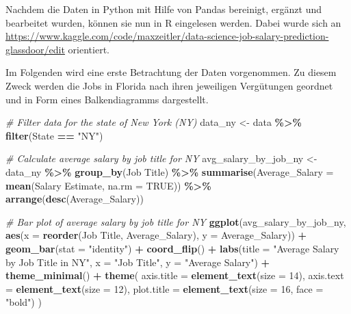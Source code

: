 \documentclass[
]{article}
\newenvironment{Shaded}{\begin{snugshade}}{\end{snugshade}}
\newcommand{\AttributeTok}[1]{\textcolor[rgb]{0.13,0.29,0.53}{#1}}
\newcommand{\CommentTok}[1]{\textcolor[rgb]{0.56,0.35,0.01}{\textit{#1}}}
\newcommand{\ConstantTok}[1]{\textcolor[rgb]{0.56,0.35,0.01}{#1}}
\newcommand{\DecValTok}[1]{\textcolor[rgb]{0.00,0.00,0.81}{#1}}
\newcommand{\FunctionTok}[1]{\textcolor[rgb]{0.13,0.29,0.53}{\textbf{#1}}}
\newcommand{\NormalTok}[1]{#1}
\newcommand{\OtherTok}[1]{\textcolor[rgb]{0.56,0.35,0.01}{#1}}
\newcommand{\SpecialCharTok}[1]{\textcolor[rgb]{0.81,0.36,0.00}{\textbf{#1}}}
\newcommand{\StringTok}[1]{\textcolor[rgb]{0.31,0.60,0.02}{#1}}
\begin{document}
Nachdem die Daten in Python mit Hilfe von Pandas bereinigt, ergänzt und
bearbeitet wurden, können sie nun in R eingelesen werden. Dabei wurde
sich an
\url{https://www.kaggle.com/code/maxzeitler/data-science-job-salary-prediction-glassdoor/edit}
orientiert.

Im Folgenden wird eine erste Betrachtung der Daten vorgenommen. Zu
diesem Zweck werden die Jobs in Florida nach ihren jeweiligen
Vergütungen geordnet und in Form eines Balkendiagramms dargestellt.

\begin{Shaded}
\begin{Highlighting}[]
\CommentTok{\# Filter data for the state of New York (NY)}
\NormalTok{data\_ny }\OtherTok{\textless{}{-}}\NormalTok{ data }\SpecialCharTok{\%\textgreater{}\%}
  \FunctionTok{filter}\NormalTok{(State }\SpecialCharTok{==} \StringTok{"NY"}\NormalTok{)}

\CommentTok{\# Calculate average salary by job title for NY}
\NormalTok{avg\_salary\_by\_job\_ny }\OtherTok{\textless{}{-}}\NormalTok{ data\_ny }\SpecialCharTok{\%\textgreater{}\%}
  \FunctionTok{group\_by}\NormalTok{(}\StringTok{\textasciigrave{}}\AttributeTok{Job Title}\StringTok{\textasciigrave{}}\NormalTok{) }\SpecialCharTok{\%\textgreater{}\%}
  \FunctionTok{summarise}\NormalTok{(}\AttributeTok{Average\_Salary =} \FunctionTok{mean}\NormalTok{(}\StringTok{\textasciigrave{}}\AttributeTok{Salary Estimate}\StringTok{\textasciigrave{}}\NormalTok{, }\AttributeTok{na.rm =} \ConstantTok{TRUE}\NormalTok{)) }\SpecialCharTok{\%\textgreater{}\%}
  \FunctionTok{arrange}\NormalTok{(}\FunctionTok{desc}\NormalTok{(Average\_Salary))}

\CommentTok{\# Bar plot of average salary by job title for NY}
\FunctionTok{ggplot}\NormalTok{(avg\_salary\_by\_job\_ny,}
       \FunctionTok{aes}\NormalTok{(}\AttributeTok{x =} \FunctionTok{reorder}\NormalTok{(}\StringTok{\textasciigrave{}}\AttributeTok{Job Title}\StringTok{\textasciigrave{}}\NormalTok{, Average\_Salary), }\AttributeTok{y =}\NormalTok{ Average\_Salary)) }\SpecialCharTok{+}
  \FunctionTok{geom\_bar}\NormalTok{(}\AttributeTok{stat =} \StringTok{"identity"}\NormalTok{) }\SpecialCharTok{+}
  \FunctionTok{coord\_flip}\NormalTok{() }\SpecialCharTok{+}
  \FunctionTok{labs}\NormalTok{(}\AttributeTok{title =} \StringTok{"Average Salary by Job Title in NY"}\NormalTok{,}
       \AttributeTok{x =} \StringTok{"Job Title"}\NormalTok{,}
       \AttributeTok{y =} \StringTok{"Average Salary"}\NormalTok{) }\SpecialCharTok{+}
  \FunctionTok{theme\_minimal}\NormalTok{() }\SpecialCharTok{+}
  \FunctionTok{theme}\NormalTok{(}
    \AttributeTok{axis.title =} \FunctionTok{element\_text}\NormalTok{(}\AttributeTok{size =} \DecValTok{14}\NormalTok{),}
    \AttributeTok{axis.text =} \FunctionTok{element\_text}\NormalTok{(}\AttributeTok{size =} \DecValTok{12}\NormalTok{),}
    \AttributeTok{plot.title =} \FunctionTok{element\_text}\NormalTok{(}\AttributeTok{size =} \DecValTok{16}\NormalTok{, }\AttributeTok{face =} \StringTok{"bold"}\NormalTok{)}
\NormalTok{  )}
\end{Highlighting}
\end{Shaded}
\end{document}
